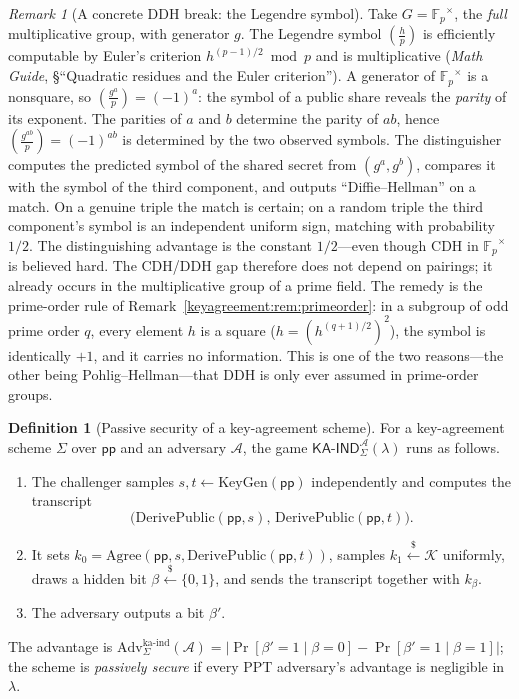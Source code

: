 \documentclass[11pt,a4paper]{article}
\theoremstyle{definition}
\newtheorem{definition}[theorem]{Definition}
\theoremstyle{remark}
\newtheorem{remark}[theorem]{Remark}
\newcommand{\Fp}{\ensuremath{\mathbb{F}_{p}}}
\newcommand{\legendre}[2]{\left(\frac{#1}{#2}\right)}
\providecommand{\abs}[1]{\lvert #1 \rvert}
\begin{document}
\begin{remark}[A concrete DDH break: the Legendre symbol]
\label{keyagreement:rem:legendre}
Take \(G = \Fp^{\times}\), the \emph{full} multiplicative group, with
generator \(g\). The Legendre symbol \(\legendre{h}{p}\) is
efficiently computable by Euler's criterion
\(h^{(p-1)/2} \bmod p\) and is multiplicative (\emph{Math Guide},
\S``Quadratic residues and the Euler criterion''). A generator of
\(\Fp^{\times}\) is a nonsquare, so
\(\legendre{g^{a}}{p} = (-1)^{a}\): the symbol of a public share
reveals the \emph{parity} of its exponent. The parities of \(a\) and
\(b\) determine the parity of \(ab\), hence
\(\legendre{g^{ab}}{p} = (-1)^{ab}\) is determined by the two
observed symbols. The distinguisher computes the predicted symbol of
the shared secret from \((g^{a}, g^{b})\), compares it with the
symbol of the third component, and outputs ``Diffie--Hellman'' on a
match. On a genuine triple the match is certain; on a random triple
the third component's symbol is an independent uniform sign, matching
with probability \(1/2\). The distinguishing advantage is the
constant \(1/2\)---even though CDH in \(\Fp^{\times}\) is believed
hard. The CDH/DDH gap therefore does not depend on pairings; it
already occurs in the multiplicative group of a prime field. The
remedy is the prime-order rule of
Remark~\ref{keyagreement:rem:primeorder}: in a subgroup of odd prime
order \(q\), every element \(h\) is a square
(\(h = (h^{(q+1)/2})^{2}\)), the symbol is identically \(+1\), and
it carries no information. This is one of the two reasons---the other
being Pohlig--Hellman---that DDH is only ever assumed in prime-order
groups.
\end{remark}

\begin{definition}[Passive security of a key-agreement scheme]
\label{keyagreement:def:passive}
For a key-agreement scheme \(\Sigma\) over \(\mathsf{pp}\) and an
adversary \(\mathcal{A}\), the game
\(\mathsf{KA\text{-}IND}^{\mathcal{A}}_{\Sigma}(\lambda)\) runs as
follows.
\begin{enumerate}
\item The challenger samples
  \(s, t \gets \mathrm{KeyGen}(\mathsf{pp})\) independently and
  computes the transcript
  \[
  \bigl(\mathrm{DerivePublic}(\mathsf{pp}, s),\,
  \mathrm{DerivePublic}(\mathsf{pp}, t)\bigr).
  \]
\item It sets
  \(k_{0} = \mathrm{Agree}(\mathsf{pp}, s,
  \mathrm{DerivePublic}(\mathsf{pp}, t))\), samples
  \(k_{1} \xleftarrow{\$} \mathcal{K}\) uniformly, draws a hidden bit
  \(\beta \xleftarrow{\$} \{0,1\}\), and sends the transcript
  together with \(k_{\beta}\).
\item The adversary outputs a bit \(\beta'\).
\end{enumerate}
The advantage is
\(\mathrm{Adv}^{\mathrm{ka\text{-}ind}}_{\Sigma}(\mathcal{A})
= \abs{\Pr[\beta' = 1 \mid \beta = 0]
- \Pr[\beta' = 1 \mid \beta = 1]}\); the scheme is \emph{passively
secure} if every PPT adversary's advantage is negligible in
\(\lambda\).
\end{definition}
\end{document}
